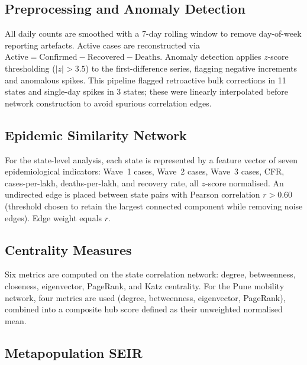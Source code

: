 \documentclass[sigconf,authordraft]{acmart}
\begin{document}
\subsection{Preprocessing and Anomaly Detection}

All daily counts are smoothed with a 7-day rolling window to remove
day-of-week reporting artefacts. Active cases are reconstructed via
$\text{Active} = \text{Confirmed} - \text{Recovered} - \text{Deaths}$.
Anomaly detection applies $z$-score thresholding ($|z| > 3.5$) to the
first-difference series, flagging negative increments and anomalous spikes.
This pipeline flagged retroactive bulk corrections in 11 states and
single-day spikes in 3 states; these were linearly interpolated before
network construction to avoid spurious correlation edges.

\subsection{Epidemic Similarity Network}

For the state-level analysis, each state is represented by a feature
vector of seven epidemiological indicators: Wave~1 cases, Wave~2 cases,
Wave~3 cases, CFR, cases-per-lakh, deaths-per-lakh, and recovery rate,
all $z$-score normalised. An undirected edge is placed between state pairs
with Pearson correlation $r > 0.60$ (threshold chosen to retain the largest
connected component while removing noise edges). Edge weight equals $r$.

\subsection{Centrality Measures}

Six metrics are computed on the state correlation network: degree,
betweenness, closeness, eigenvector, PageRank, and Katz centrality.
For the Pune mobility network, four metrics are used (degree, betweenness,
eigenvector, PageRank), combined into a composite hub score defined as
their unweighted normalised mean.

\subsection{Metapopulation SEIR}
\end{document}
